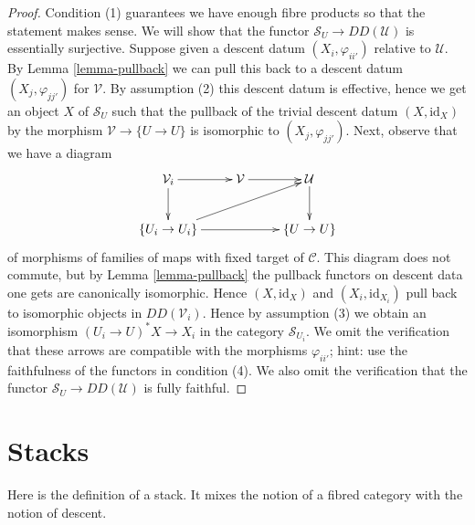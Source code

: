 \documentclass{stacks-project}
\theoremstyle{plain}
\theoremstyle{definition}
\theoremstyle{remark}
\numberwithin{equation}{subsection}
\begin{document}
\begin{proof}
Condition (1) guarantees we have enough fibre products so that
the statement makes sense.
We will show that the functor $\mathcal{S}_U \to DD(\mathcal{U})$ is
essentially surjective. Suppose given a descent datum
$(X_i, \varphi_{ii'})$ relative to $\mathcal{U}$.
By Lemma \ref{lemma-pullback} we can pull this back to a descent datum
$(X_j, \varphi_{jj'})$ for $\mathcal{V}$.
By assumption (2) this descent datum is effective, hence we
get an object $X$ of $\mathcal{S}_U$ such that the
pullback of the trivial descent datum $(X, \text{id}_X)$
by the morphism $\mathcal{V} \to \{U \to U\}$ is isomorphic to
$(X_j, \varphi_{jj'})$. Next, observe that we have a diagram
$$
\xymatrix{
\mathcal{V}_i \ar[r] \ar[d] &
\mathcal{V} \ar[r] &
\mathcal{U} \ar[d] \\
\{U_i \to U_i\} \ar[rr] \ar[rru] & &
\{U \to U\}
}
$$
of morphisms of families of maps with fixed target of $\mathcal{C}$.
This diagram does not commute, but by Lemma \ref{lemma-pullback}
the pullback functors on descent data one gets are canonically
isomorphic. Hence $(X, \text{id}_X)$ and $(X_i, \text{id}_{X_i})$
pull back to isomorphic objects in $DD(\mathcal{V}_i)$.
Hence by assumption (3) we obtain an isomorphism
$(U_i \to U)^*X \to X_i$ in the category $\mathcal{S}_{U_i}$.
We omit the verification that these arrows are compatible
with the morphisms $\varphi_{ii'}$; hint: use the faithfulness
of the functors in condition (4).
We also omit the verification that the functor
$\mathcal{S}_U \to DD(\mathcal{U})$ is
fully faithful.
\end{proof}













\section{Stacks}
\label{section-definition}

\noindent
Here is the definition of a stack. It mixes the notion of a fibred
category with the notion of descent.
\end{document}
